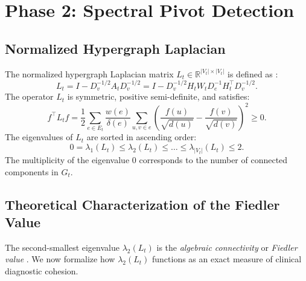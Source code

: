 \documentclass[10pt, onecolumn]{article}
\newcommand{\R}{\mathbb{R}}
\begin{document}
\section{Phase 2: Spectral Pivot Detection}
\label{sec:phase2}

\subsection{Normalized Hypergraph Laplacian}

The normalized hypergraph Laplacian matrix $L_t \in \R^{|V_t| \times |V_t|}$ is defined as \cite{chung1997spectral}:
\begin{equation}
  L_t = I - D_v^{-1/2} A_t D_v^{-1/2} = I - D_v^{-1/2} H_t W_t D_e^{-1} H_t^\top D_v^{-1/2}.
  \label{eq:norm_laplacian}
\end{equation}
The operator $L_t$ is symmetric, positive semi-definite, and satisfies:
\begin{equation}
  f^\top L_t f = \frac{1}{2} \sum_{e \in E_t} \frac{w(e)}{\delta(e)} \sum_{u, v \in e} \left( \frac{f(u)}{\sqrt{d(u)}} - \frac{f(v)}{\sqrt{d(v)}} \right)^2 \ge 0.
  \label{eq:laplacian_quad}
\end{equation}
The eigenvalues of $L_t$ are sorted in ascending order:
\begin{equation}
  0 = \lambda_1(L_t) \le \lambda_2(L_t) \le \dots \le \lambda_{|V_t|}(L_t) \le 2.
  \label{eq:eigenvalues}
\end{equation}
The multiplicity of the eigenvalue $0$ corresponds to the number of connected components in $G_t$.

\subsection{Theoretical Characterization of the Fiedler Value}

The second-smallest eigenvalue $\lambda_2(L_t)$ is the \emph{algebraic connectivity} or \emph{Fiedler value} \cite{fiedler1973algebraic}. We now formalize how $\lambda_2(L_t)$ functions as an exact measure of clinical diagnostic cohesion.
\end{document}
